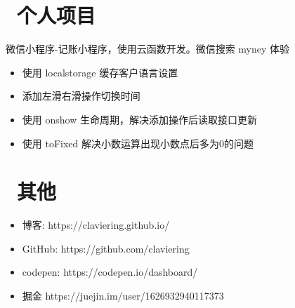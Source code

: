 \documentclass{resume}
\begin{document}
\section{\faBatteryFull\ 个人项目}

\begin{onehalfspacing}
微信小程序-记账小程序，使用云函数开发。微信搜索 myney 体验
\begin{itemize}
  \item 使用 localstorage 缓存客户语言设置
  \item 添加左滑右滑操作切换时间
  \item 使用 onshow 生命周期，解决添加操作后读取接口更新
  \item 使用 toFixed 解决小数运算出现小数点后多为0的问题
\end{itemize}
\end{onehalfspacing}



\section{\faInfo\ 其他}
\begin{itemize}[parsep=0.5ex]
  \item 博客: https://claviering.github.io/
  \item GitHub: https://github.com/claviering
  \item codepen: https://codepen.io/dashboard/
  \item 掘金 https://juejin.im/user/1626932940117373
\end{itemize}

%
%
\end{document}
